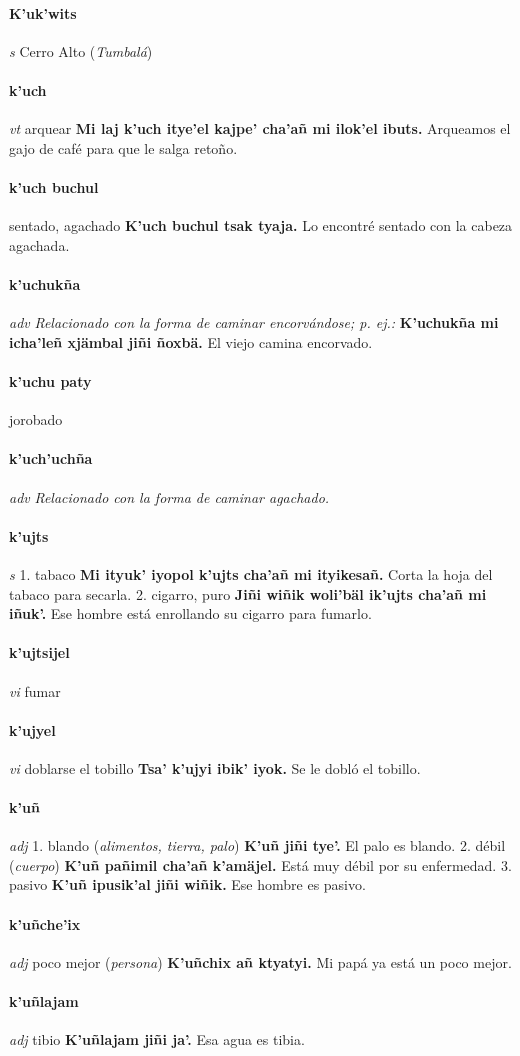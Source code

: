 \documentclass{scrbook}
\newcommand{\entry}[1]{\paragraph{#1}}
\newcommand{\onedefinition}[1]{#1.}
\newcommand{\nontranslationdef}[1]{\textit{#1}}
\newcommand{\partofspeech}[1]{\textit{#1}}
\newcommand{\spanishtranslation}[1]{#1}
\newcommand{\clarification}[1]{(\textit{#1})}
\newcommand{\cholexample}[1]{\textbf{#1}}
\newcommand{\exampletranslation}[1]{#1}
\begin{document}
\begin{multicols}{2}
\entry{K'uk'wits}
\partofspeech{s}
\spanishtranslation{Cerro Alto}
\clarification{Tumbalá}

\entry{k'uch}
\partofspeech{vt}
\spanishtranslation{arquear}
\cholexample{Mi laj k'uch itye'el kajpe' cha'añ mi ilok'el ibuts.}
\exampletranslation{Arqueamos el gajo de café para que le salga retoño.}

\entry{k'uch buchul}
\spanishtranslation{sentado, agachado}
\cholexample{K'uch buchul tsak tyaja.}
\exampletranslation{Lo encontré sentado con la cabeza agachada.}

\entry{k'uchukña}
\partofspeech{adv}
\nontranslationdef{Relacionado con la forma de caminar encorvándose; p. ej.:}
\cholexample{K'uchukña mi icha'leñ xjämbal jiñi ñoxbä.}
\exampletranslation{El viejo camina encorvado.}

\entry{k'uchu paty}
\spanishtranslation{jorobado}

\entry{k'uch'uchña}
\partofspeech{adv}
\nontranslationdef{Relacionado con la forma de caminar agachado.}

\entry{k'ujts}
\partofspeech{s}
\onedefinition{1}
\spanishtranslation{tabaco}
\cholexample{Mi ityuk' iyopol k'ujts cha'añ mi ityikesañ.}
\exampletranslation{Corta la hoja del tabaco para secarla.}
\onedefinition{2}
\spanishtranslation{cigarro, puro}
\cholexample{Jiñi wiñik woli'bäl ik'ujts cha'añ mi iñuk'.}
\exampletranslation{Ese hombre está enrollando su cigarro para fumarlo.}

\entry{k'ujtsijel}
\partofspeech{vi}
\spanishtranslation{fumar}

\entry{k'ujyel}
\partofspeech{vi}
\spanishtranslation{doblarse el tobillo}
\cholexample{Tsa' k'ujyi ibik' iyok.}
\exampletranslation{Se le dobló el tobillo.}

\entry{k'uñ}
\partofspeech{adj}
\onedefinition{1}
\spanishtranslation{blando}
\clarification{alimentos, tierra, palo}
\cholexample{K'uñ jiñi tye'.}
\exampletranslation{El palo es blando.}
\onedefinition{2}
\spanishtranslation{débil}
\clarification{cuerpo}
\cholexample{K'uñ pañimil cha'añ k'amäjel.}
\exampletranslation{Está muy débil por su enfermedad.}
\onedefinition{3}
\spanishtranslation{pasivo}
\cholexample{K'uñ ipusik'al jiñi wiñik.}
\exampletranslation{Ese hombre es pasivo.}

\entry{k'uñche'ix}
\partofspeech{adj}
\spanishtranslation{poco mejor}
\clarification{persona}
\cholexample{K'uñchix añ ktyatyi.}
\exampletranslation{Mi papá ya está un poco mejor.}

\entry{k'uñlajam}
\partofspeech{adj}
\spanishtranslation{tibio}
\cholexample{K'uñlajam jiñi ja'.}
\exampletranslation{Esa agua es tibia.}


\end{multicols}
\end{document}
